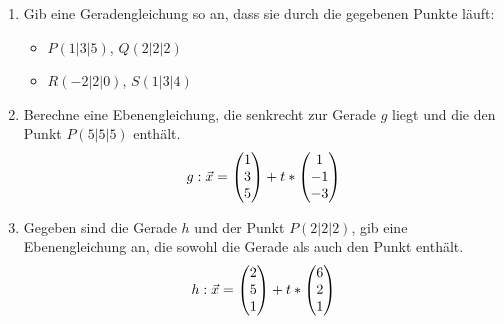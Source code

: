 	\begin{enumerate}
		\item Gib eine Geradengleichung so an, dass sie durch die gegebenen Punkte läuft:
		\begin{itemize}
			\item $P(1|3|5)$, $Q(2|2|2)$
			\item $R(-2|2|0)$, $S(1|3|4)$
		\end{itemize}
		\item Berechne eine Ebenengleichung, die senkrecht zur Gerade $g$ liegt und die den Punkt $P(5|5|5)$ enthält.
		\begin{equation*}
			g:\vec x=\begin{pmatrix} 1\\3\\5 \end{pmatrix}+t*\begin{pmatrix} 1\\-1\\-3 \end{pmatrix}
		\end{equation*}
		\item Gegeben sind die Gerade $h$ und der Punkt $P(2|2|2)$, gib eine Ebenengleichung an, die sowohl die Gerade als auch den Punkt enthält.
		\begin{equation*}
			h:\vec x=\begin{pmatrix} 2\\5\\1 \end{pmatrix}+t*\begin{pmatrix} 6\\2\\1 \end{pmatrix}
		\end{equation*}
	\end{enumerate}
